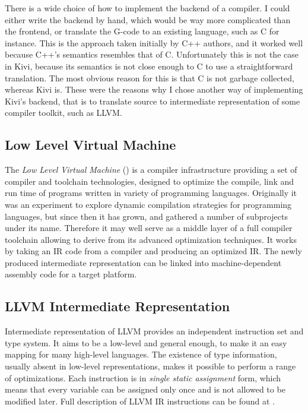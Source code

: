 \documentclass[12pt,a4paper]{report}
\begin{document}
There is a wide choice of how to implement the backend of a compiler. I could
either write the backend by hand, which would be way more complicated than the
frontend, or translate the G-code to an existing language, such as C for
instance. This is the approach taken initially by C++ authors, and it worked
well because C++'s semantics resembles that of C. Unfortunately this is not the
case in Kivi, because its semantics is not close enough to C to use a
straightforward translation. The most obvious reason for this is that C is not
garbage collected, whereas Kivi is. These were the reasons why I chose another
way of implementing Kivi's backend, that is to translate source to intermediate
representation of some compiler toolkit, such as LLVM.

\subsection{Low Level Virtual Machine}
The \textit{Low Level Virtual Machine} (\cite{website:llvm}) is a compiler
infrastructure providing a set of compiler and toolchain technologies, designed
to optimize the compile, link and run time of programs written in variety of
programming languages. Originally it was an experiment to explore dynamic
compilation strategies for programming languages, but since then it has grown,
and gathered a number of subprojects under its name. Therefore it may well
serve as a middle layer of a full compiler toolchain allowing to derive from
its advanced optimization techniques. It works by taking an IR code from a
compiler and producing an optimized IR. The newly produced intermediate
representation can be linked into machine-dependent assembly code for a target
platform.

\subsection{LLVM Intermediate Representation}
Intermediate representation of LLVM provides an independent instruction set and
type system. It aims to be a low-level and general enough, to make it an easy
mapping for many high-level languages. The existence of type information,
usually absent in low-level representations, makes it possible to perform a
range of optimizations. Each instruction is in \textit{single static
assignment} form, which means that every variable can be assigned only once and
is not allowed to be modified later. Full description of LLVM IR instructions
can be found at \cite{website:llvm_ir}.
\end{document}
